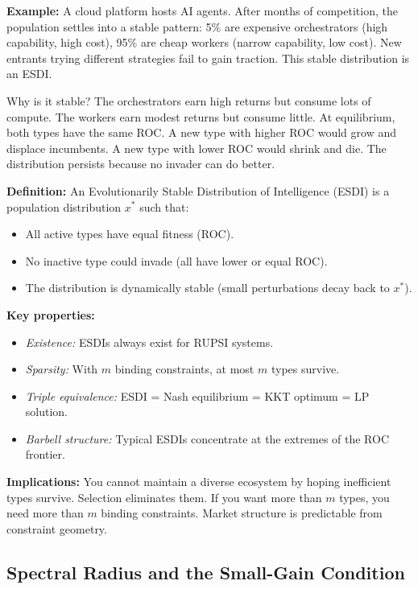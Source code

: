 \documentclass[12pt]{article}
\begin{document}
\textbf{Example:} A cloud platform hosts AI agents. After months of competition, the population settles into a stable pattern: 5\% are expensive orchestrators (high capability, high cost), 95\% are cheap workers (narrow capability, low cost). New entrants trying different strategies fail to gain traction. This stable distribution is an ESDI.

Why is it stable? The orchestrators earn high returns but consume lots of compute. The workers earn modest returns but consume little. At equilibrium, both types have the same ROC. A new type with higher ROC would grow and displace incumbents. A new type with lower ROC would shrink and die. The distribution persists because no invader can do better.

\textbf{Definition:} An Evolutionarily Stable Distribution of Intelligence (ESDI) is a population distribution $x^*$ such that:
\begin{itemize}[nosep]
\item All active types have equal fitness (ROC).
\item No inactive type could invade (all have lower or equal ROC).
\item The distribution is dynamically stable (small perturbations decay back to $x^*$).
\end{itemize}

\textbf{Key properties:}
\begin{itemize}[nosep]
\item \emph{Existence:} ESDIs always exist for RUPSI systems.
\item \emph{Sparsity:} With $m$ binding constraints, at most $m$ types survive.
\item \emph{Triple equivalence:} ESDI = Nash equilibrium = KKT optimum = LP solution.
\item \emph{Barbell structure:} Typical ESDIs concentrate at the extremes of the ROC frontier.
\end{itemize}

\textbf{Implications:} You cannot maintain a diverse ecosystem by hoping inefficient types survive. Selection eliminates them. If you want more than $m$ types, you need more than $m$ binding constraints. Market structure is predictable from constraint geometry.

\subsection{Spectral Radius and the Small-Gain Condition}
\end{document}

